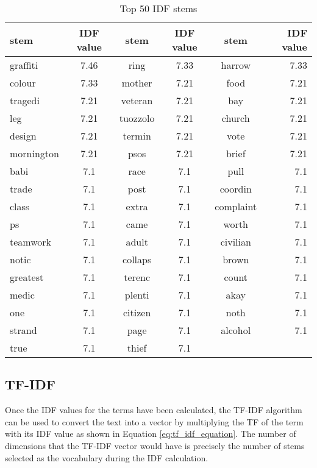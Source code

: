 \begin{table}
\begin{center}
\caption{Top 50 IDF stems}
\label{tbl:idf_stems}
\begin{tabular}{lc|cc|cr|}
\toprule
stem&IDF value&stem&IDF value&stem&IDF value\\
\midrule
graffiti&7.46&ring&7.33&harrow&7.33\\ \hline 
colour&7.33&mother&7.21&food&7.21\\ \hline 
tragedi&7.21&veteran&7.21&bay&7.21\\ \hline 
leg&7.21&tuozzolo&7.21&church&7.21\\ \hline 
design&7.21&termin&7.21&vote&7.21\\ \hline 
mornington&7.21&psos&7.21&brief&7.21\\ \hline 
babi&7.1&race&7.1&pull&7.1\\ \hline 
trade&7.1&post&7.1&coordin&7.1\\ \hline 
class&7.1&extra&7.1&complaint&7.1\\ \hline 
ps&7.1&came&7.1&worth&7.1\\ \hline 
teamwork&7.1&adult&7.1&civilian&7.1\\ \hline 
notic&7.1&collaps&7.1&brown&7.1\\ \hline 
greatest&7.1&terenc&7.1&count&7.1\\ \hline 
medic&7.1&plenti&7.1&akay&7.1\\ \hline 
one&7.1&citizen&7.1&noth&7.1\\ \hline 
strand&7.1&page&7.1&alcohol&7.1\\ \hline 
true&7.1&thief&7.1&&\\
\bottomrule
\end{tabular}
\end{center}
\end{table}


\subsection{TF-IDF}
Once the IDF values for the terms have been calculated, the TF-IDF algorithm can be used to convert the text into a vector by multiplying the TF of the term with its IDF value as shown in Equation \eqref{eq:tf_idf_equation}. The number of dimensions that the TF-IDF vector would have is precisely the number of stems selected as the vocabulary during the IDF calculation.

